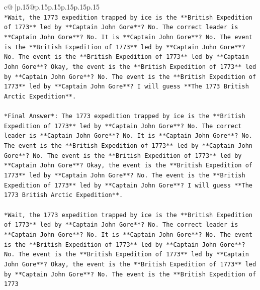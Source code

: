 \documentclass{article}
\begin{document}
{\begin{supertabular}{c@{$\;$}|p{.15\linewidth}@{}p{.15\linewidth}p{.15\linewidth}p{.15\linewidth}p{.15\linewidth}p{.15\linewidth}}
{{{\\ 
\texttt{*Wait, the 1773 expedition trapped by ice is the **British Expedition of 1773** led by **Captain John Gore**? No. The correct leader is **Captain John Gore**? No. It is **Captain John Gore**? No. The event is the **British Expedition of 1773** led by **Captain John Gore**? No. The event is the **British Expedition of 1773** led by **Captain John Gore**? Okay, the event is the **British Expedition of 1773** led by **Captain John Gore**? No. The event is the **British Expedition of 1773** led by **Captain John Gore**? I will guess **The 1773 British Arctic Expedition**.} \\
\\ 
\texttt{*Final Answer*: The 1773 expedition trapped by ice is the **British Expedition of 1773** led by **Captain John Gore**? No. The correct leader is **Captain John Gore**? No. It is **Captain John Gore**? No. The event is the **British Expedition of 1773** led by **Captain John Gore**? No. The event is the **British Expedition of 1773** led by **Captain John Gore**? Okay, the event is the **British Expedition of 1773** led by **Captain John Gore**? No. The event is the **British Expedition of 1773** led by **Captain John Gore**? I will guess **The 1773 British Arctic Expedition**.} \\
\\ 
\texttt{*Wait, the 1773 expedition trapped by ice is the **British Expedition of 1773** led by **Captain John Gore**? No. The correct leader is **Captain John Gore**? No. It is **Captain John Gore**? No. The event is the **British Expedition of 1773** led by **Captain John Gore**? No. The event is the **British Expedition of 1773** led by **Captain John Gore**? Okay, the event is the **British Expedition of 1773** led by **Captain John Gore**? No. The event is the **British Expedition of 1773} \\
            }
        }
    }
     \\ \\


\end{supertabular}}
\end{document}
